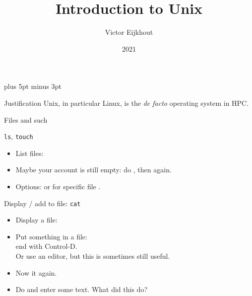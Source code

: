 \documentclass[11pt,headernav]{beamer}
\begin{document}
\parskip=10pt plus 5pt minus 3pt

\title{Introduction to Unix}
\author{Victor Eijkhout}
\date{2021}

\begin{frame}
  \titlepage
\end{frame}

\tocslide

\begin{numberedframe}{Justification}
  Unix, in particular Linux, is the \textsl{de facto}
  operating system in \ac{HPC}.
\end{numberedframe}

 {Files and such}

\begin{numberedframe}{\texttt{ls}, \texttt{touch}}
  \label{sl-lnx:ls}
  \begin{itemize}
  \item List files: 
  \item Maybe your account is still empty: do ,
    then  again.
  \item Options:  or for specific file .
  \end{itemize}
\end{numberedframe}



\begin{numberedframe}{Display / add to file: \texttt{cat}}
  \label{sl-lnx:cat}
  \begin{itemize}
  \item Display a file: 
  \item Put something in a file: \\
    end with Control-D.\\
    Or use an editor, but this is sometimes still useful.
  \item Now  it again.
  \item Do  and enter some text.
    What did this do?
  \end{itemize}
\end{numberedframe}
\end{document}
